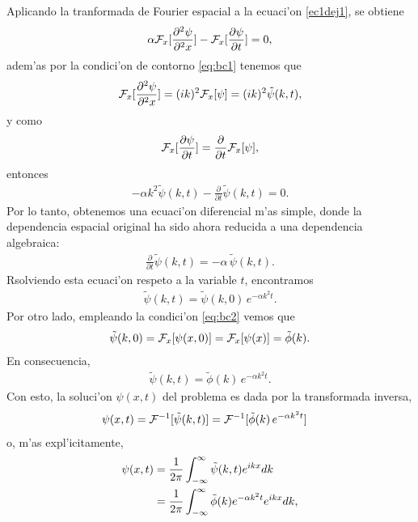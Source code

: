 Aplicando la tranformada de Fourier espacial a la ecuaci'on \eqref{ec1dej1}, se obtiene
\begin{align}
\alpha {\cal F}_{x}[\frac{\partial^2 \psi}{\partial^2 x}]-{\cal F}_{x}[\frac{\partial \psi}{\partial t}]=0,
\end{align}
adem'as por la condici'on de contorno \eqref{eq:bc1} tenemos que
\begin{align}
{\cal F}_{x}[\frac{\partial^2 \psi}{\partial^2 x}]=(i k)^2 {\cal F}_{x}[\psi]=(i k)^2 \tilde{\psi}(k,t),
\end{align}
y como
\begin{align}
{\cal F}_{x}[\frac{\partial \psi}{\partial t}]=\frac{\partial}{\partial t}{\cal F}_{x}[\psi],
\end{align}
entonces
\begin{align}
-\alpha k^2 \tilde{\psi}(k,t)-\frac{\partial}{\partial t}\tilde{\psi}(k,t)=0.
\end{align}
Por lo tanto, obtenemos una ecuaci'on diferencial m'as simple, donde la dependencia espacial original ha sido ahora reducida a una dependencia algebraica:
\begin{align}
\frac{\partial}{\partial t}\tilde{\psi}(k,t)=-\alpha\, \tilde{\psi}(k,t).
\end{align}
Rsolviendo esta ecuaci'on respeto a la variable $t$, encontramos
\begin{align}
\tilde{\psi}(k,t)=\tilde{\psi}(k,0)\,e^{-\alpha k^2 t}.
\end{align}
Por otro lado, empleando la condici'on \eqref{eq:bc2} vemos que
\begin{align}
\tilde{\psi}(k,0) = {\cal F}_{x}[\psi(x,0)]={\cal F}_{x}[\psi(x)] =\tilde{\phi}(k).
\end{align}
En consecuencia,
\begin{align}
\tilde{\psi}(k,t)=\tilde{\phi}(k)\,e^{-\alpha k^2 t}.
\end{align}
Con esto, la soluci'on $\psi(x,t)$ del problema es dada por la transformada inversa,
\begin{align}
\psi(x,t) &= {\cal F}^{-1}[\tilde{\psi}(k,t)]= {\cal F}^{-1}[\tilde{\phi}(k)\,e^{-\alpha k^2 t}]
\end{align}
o, m'as expl'icitamente,
\begin{align}
\psi(x,t) &= \frac{1}{2\pi}\int_{-\infty}^{\infty}\tilde{\psi}(k,t)e^{ikx} dk\notag \\
&= \frac{1}{2\pi}\int_{-\infty}^{\infty}\tilde{\phi}(k)e^{-\alpha k^2 t}e^{ikx} dk,
\end{align}
